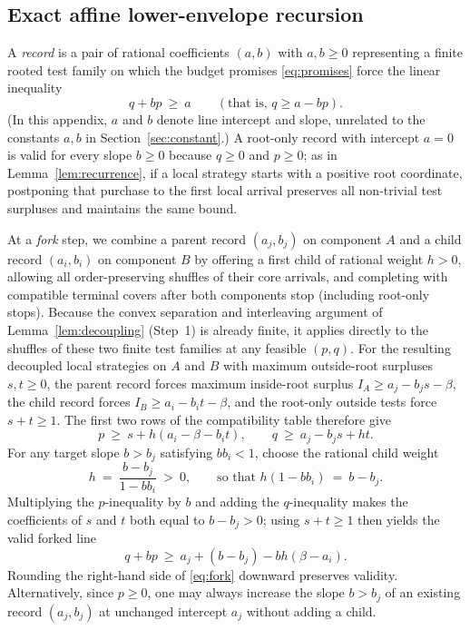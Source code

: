 \documentclass[11pt,letterpaper]{article}
\begin{document}
\subsection*{Exact affine lower-envelope recursion}

A \emph{record} is a pair of rational coefficients $(a,b)$ with $a,b\ge 0$ representing a finite rooted test family on which the budget promises \eqref{eq:promises} force the linear inequality
\[
  q + b p\ \ge\ a \qquad(\text{that is, } q\ge a - bp).
\]
(In this appendix, $a$ and $b$ denote line intercept and slope, unrelated to the constants $a,b$ in Section~\ref{sec:constant}.) A root-only record with intercept $a=0$ is valid for every slope $b\ge 0$ because $q\ge 0$ and $p\ge 0$; as in Lemma~\ref{lem:recurrence}, if a local strategy starts with a positive root coordinate, postponing that purchase to the first local arrival preserves all non-trivial test surpluses and maintains the same bound.

At a \emph{fork} step, we combine a parent record $(a_j,b_j)$ on component $A$ and a child record $(a_i,b_i)$ on component $B$ by offering a first child of rational weight $h>0$, allowing all order-preserving shuffles of their core arrivals, and completing with compatible terminal covers after both components stop (including root-only stops). Because the convex separation and interleaving argument of Lemma~\ref{lem:decoupling} (Step~1) is already finite, it applies directly to the shuffles of these two finite test families at any feasible $(p,q)$. For the resulting decoupled local strategies on $A$ and $B$ with maximum outside-root surpluses $s,t\ge 0$, the parent record forces maximum inside-root surplus $I_A \ge a_j - b_j s - \beta$, the child record forces $I_B \ge a_i - b_i t - \beta$, and the root-only outside tests force $s+t\ge 1$. The first two rows of the compatibility table therefore give
\[
  p\ \ge\ s + h(a_i - \beta - b_i t),\qquad
  q\ \ge\ a_j - b_j s + h t .
\]
For any target slope $b > b_j$ satisfying $b b_i < 1$, choose the rational child weight
\[
  h\ =\ \frac{b - b_j}{1 - b b_i}\ >\ 0, \qquad\text{so that } h(1 - b b_i)\ =\ b - b_j .
\]
Multiplying the $p$-inequality by $b$ and adding the $q$-inequality makes the coefficients of $s$ and $t$ both equal to $b-b_j>0$; using $s+t\ge 1$ then yields the valid forked line
\begin{equation}\label{eq:fork}
  q + b p\ \ge\ a_j + (b - b_j) - b h(\beta - a_i).
\end{equation}
Rounding the right-hand side of \eqref{eq:fork} downward preserves validity. Alternatively, since $p\ge 0$, one may always increase the slope $b>b_j$ of an existing record $(a_j,b_j)$ at unchanged intercept $a_j$ without adding a child.
\end{document}
